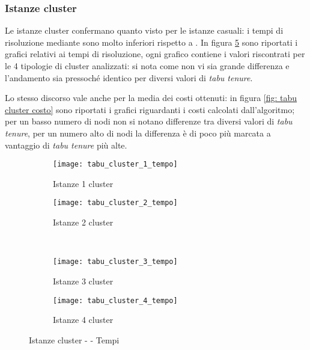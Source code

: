 \subsubsection{Istanze cluster}
Le istanze cluster confermano quanto visto per le istanze casuali: i tempi di risoluzione mediante \tabu sono molto inferiori rispetto a .
In figura \ref{fig: tabu cluster tempo} sono riportati i grafici relativi ai tempi di risoluzione, ogni grafico contiene i valori riscontrati per le 4 tipologie di cluster analizzati: si nota come non vi sia grande differenza e l'andamento sia pressoché identico per diversi valori di \emph{tabu tenure}.

Lo stesso discorso vale anche per la media dei costi ottenuti: in figura \ref{fig: tabu cluster costo} sono riportati i grafici riguardanti i costi calcolati dall'algoritmo; per un basso numero di nodi non si notano differenze tra diversi valori di \emph{tabu tenure}, per un numero alto di nodi la differenza è di poco più marcata a vantaggio di \emph{tabu tenure} più alte.

\begin{figure}[H]
	\centering
	\begin{subfigure}[b]{.45\textwidth}
		\texttt{[image: tabu\_cluster\_1\_tempo]}
		\caption{Istanze 1 cluster}
		\label{fig:tabu cluster 1 tempo}
	\end{subfigure}
	\quad
	\begin{subfigure}[b]{.45\textwidth}
		\texttt{[image: tabu\_cluster\_2\_tempo]}
		\caption{Istanze 2 cluster}
		\label{fig:tabu cluster 2 tempo}
	\end{subfigure}
	\\
	\begin{subfigure}[b]{.45\textwidth}
		\texttt{[image: tabu\_cluster\_3\_tempo]}
		\caption{Istanze 3 cluster}
		\label{fig:tabu cluster 3 tempo}
	\end{subfigure}
	\quad
	\begin{subfigure}[b]{.45\textwidth}
		\texttt{[image: tabu\_cluster\_4\_tempo]}
		\caption{Istanze 4 cluster}
		\label{fig:tabu cluster 4 tempo}
	\end{subfigure}
	\caption{Istanze cluster - \tabu{} - Tempi}
	\label{fig: tabu cluster tempo}
\end{figure}



